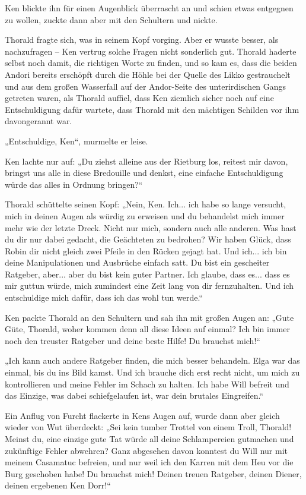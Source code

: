 \documentclass[10pt, a4paper, oneside]{book}
\begin{document}
Ken blickte ihn für einen Augenblick überrascht an und schien etwas entgegnen zu wollen, zuckte dann aber mit den Schultern und nickte.

Thorald fragte sich, was in seinem Kopf vorging. Aber er wusste besser, als nachzufragen – Ken vertrug solche Fragen nicht sonderlich gut. Thorald haderte selbst noch damit, die richtigen Worte zu finden, und so kam es, dass die beiden Andori bereits erschöpft durch die Höhle bei der Quelle des Likko gestrauchelt und aus dem großen Wasserfall auf der Andor-Seite des unterirdischen Gangs getreten waren, als Thorald auffiel, dass Ken ziemlich sicher noch auf eine Entschuldigung dafür wartete, dass Thorald mit den mächtigen Schilden vor ihm davongerannt war.

„Entschuldige, Ken“, murmelte er leise.

Ken lachte nur auf: „Du ziehst alleine aus der Rietburg los, reitest mir davon, bringst uns alle in diese Bredouille und denkst, eine einfache Entschuldigung würde das alles in Ordnung bringen?“

Thorald schüttelte seinen Kopf: „Nein, Ken. Ich... ich habe so lange versucht, mich in deinen Augen als würdig zu erweisen und du behandelst mich immer mehr wie der letzte Dreck. Nicht nur mich, sondern auch alle anderen. Was hast du dir nur dabei gedacht, die Geächteten zu bedrohen? Wir haben Glück, dass Robin dir nicht gleich zwei Pfeile in den Rücken gejagt hat. Und ich... ich bin deine Manipulationen und Ausbrüche einfach satt. Du bist ein gescheiter Ratgeber, aber... aber du bist kein guter Partner. Ich glaube, dass es... dass es mir guttun würde, mich zumindest eine Zeit lang von dir fernzuhalten. Und ich entschuldige mich dafür, dass ich das wohl tun werde.“

Ken packte Thorald an den Schultern und sah ihn mit großen Augen an: „Gute Güte, Thorald, woher kommen denn all diese Ideen auf einmal? Ich bin immer noch den treuster Ratgeber und deine beste Hilfe! Du brauchst mich!“

„Ich kann auch andere Ratgeber finden, die mich besser behandeln. Elga war das einmal, bis du ins Bild kamst. Und ich brauche dich erst recht nicht, um mich zu kontrollieren und meine Fehler im Schach zu halten. Ich habe Will befreit und das Einzige, was dabei schiefgelaufen ist, war dein brutales Eingreifen.“

Ein Anflug von Furcht flackerte in Kens Augen auf, wurde dann aber gleich wieder von Wut überdeckt: „Sei kein tumber Trottel von einem Troll, Thorald! Meinst du, eine einzige gute Tat würde all deine Schlampereien gutmachen und zukünftige Fehler abwehren? Ganz abgesehen davon konntest du Will nur mit meinem Casamatuc befreien, und nur weil ich den Karren mit dem Heu vor die Burg geschoben habe! Du brauchst mich! Deinen treuen Ratgeber, deinen Diener, deinen ergebenen Ken Dorr!“
\end{document}
